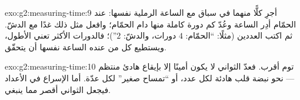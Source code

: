 \begin{solution}{exo:g2:measuring-time:9}
أجرِ كلًّا منهما في سباق مع الساعة الرملية نفسها: عند الحمّام
أدِر الساعة وعُدّ كم دورة كاملة منها دام الحمّام؛ وافعل مثل ذلك
غدًا مع الدشّ. ثم اكتب العددين (مثلًا: ``الحمّام: $4$ دورات،
والدشّ: $2$'')؛ فالدورات الأكثر تعني الأطول، ويستطيع كل من عنده
الساعة نفسها أن يتحقّق.
\end{solution}

\begin{solution}{exo:g2:measuring-time:10}
توم أقرب. فعدّ الثواني لا يكون أمينًا إلا بإيقاع هادئ منتظم ---
نحو نبضة قلب هادئة لكل عدد، أو ``تمساح صغير'' لكل عدّة. أما
الإسراع في الأعداد فيجعل الثواني أقصر مما ينبغي.
\end{solution}
